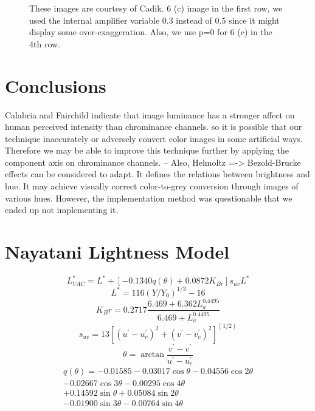 \documentclass{article}
\begin{document}
\begin{figure}[t]
\begin{center}
  \end{center}
  \caption{These images are courtesy of Cadik. 6 (c) image in the first row, we used the internal amplifier variable 0.3 instead of 0.5 since it might display some over-exaggeration. Also, we use p=0 for 6 (c) in the 4th row.}
  \label{fig:resultcomparison}
\end{figure}


\section{Conclusions}


Calabria and  Fairchild indicate that image luminance has a stronger affect on human perceived intensity than chrominance channels. so it is possible that our technique inaccurately or adversely convert color images in some artificial ways. Therefore we may be able to improve this technique further by applying the component axis on chrominance channels.
-- Also, Helmoltz =-> Bezold-Brucke effects can be considered to adapt. It defines the relations between brightness and hue. It may achieve visually correct color-to-grey conversion through images of various hues. However, the implementation method was questionable that we ended up not implementing it.


\appendix
\section{Nayatani Lightness Model}
\cite{Nayatani98}
\begin{equation}
L^*_{VAC} = L^* + [-0.1340 q(\theta) + 0.0872 K_{Br}] s_{uv} L^*
\end{equation}
\begin{equation}
L^* = 116(Y / Y_0)^{1/3} - 16
\end{equation}
\begin{equation}
K_Br = 0.2717 \frac{6.469 + 6.362L_a^{0.4495}}{6.469 + L^{0.4495}_a}
\end{equation}
\begin{equation}
s_{uv} = 13 [(u^{'} - u^{'}_c)^2 +(v^{'} - v^{'}_c)^2]^(1/2)
\end{equation}
\begin{equation}
\theta = \arctan{ \frac{  v^{'} - v^{'} }{u^{'} - u^{'}_c } }
\end{equation}
\begin{eqnarray}
q(\theta) = -0.01585 - 0.03017 \cos\theta - 0.04556 \cos2\theta \\ - 0.02667\cos3\theta - 0.00295\cos4\theta\\ + 0.14592\sin\theta + 0.05084\sin2\theta\\ - 0.01900\sin3\theta - 0.00764\sin4\theta
\end{eqnarray}
\end{document}

